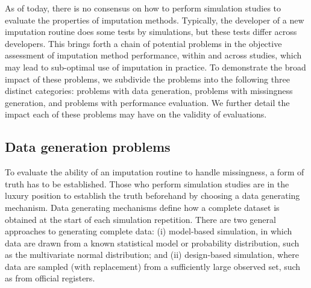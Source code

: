\documentclass[bimj,fleqn]{w-art}
\begin{document}
As of today, there is no consensus on how to perform simulation studies to evaluate the properties of imputation methods. Typically, the developer of a new imputation routine does some tests by simulations, but these tests differ across developers. This brings forth a chain of potential problems in the objective assessment of imputation method performance, within and across studies, which may lead to sub-optimal use of imputation in practice. To demonstrate the broad impact of these problems, we subdivide the problems into the following three distinct categories: problems with data generation, problems with missingness generation, and problems with performance evaluation. We further detail the impact each of these problems may have on the validity of evaluations. 


\subsection{Data generation problems}

To evaluate the ability of an imputation routine to handle missingness, a form of truth has to be established. Those who perform simulation studies are in the luxury position to establish the truth beforehand by choosing a data generating mechanism. Data generating mechanisms define how a complete dataset is obtained at the start of each simulation repetition. There are two general approaches to generating complete data: (i) model-based simulation, in which data are drawn from a known statistical model or probability distribution, such as the multivariate normal distribution; and (ii) design-based simulation, where data are sampled (with replacement) from a sufficiently large observed set, such as from official registers.
\end{document}
